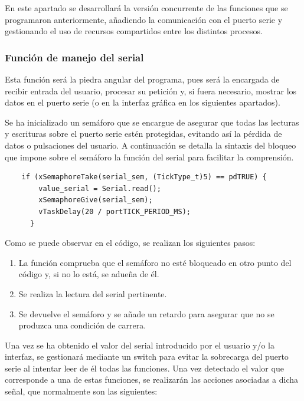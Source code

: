 En este apartado se desarrollará la versión concurrente de las funciones que se programaron anteriormente, añadiendo la comunicación con el puerto serie y gestionando el uso de recursos compartidos entre los distintos procesos. 


\subsubsection{Función de manejo del serial}

Esta función será la piedra angular del programa, pues será la encargada de recibir entrada del usuario, procesar su petición y, si fuera necesario, mostrar los datos en el puerto serie (o en la interfaz gráfica en los siguientes apartados).

Se ha inicializado un semáforo que se encargue de asegurar que todas las lecturas y escrituras sobre el puerto serie estén protegidas, evitando así la pérdida de datos o pulsaciones del usuario. A continuación se detalla la sintaxis del bloqueo que impone sobre el semáforo la función del serial para facilitar la comprensión.

\begin{verbatim}
    if (xSemaphoreTake(serial_sem, (TickType_t)5) == pdTRUE) {
        value_serial = Serial.read();
        xSemaphoreGive(serial_sem);
        vTaskDelay(20 / portTICK_PERIOD_MS);
      }  
\end{verbatim}

Como se puede observar en el código, se realizan los siguientes pasos:

\begin{enumerate}
    \item La función comprueba que el semáforo no esté bloqueado en otro punto del código y, si no lo está, se adueña de él.
    \item Se realiza la lectura del serial pertinente.
    \item Se devuelve el semáforo y se añade un retardo para asegurar que no se produzca una condición de carrera. 
\end{enumerate}

Una vez se ha obtenido el valor del serial introducido por el usuario y/o la interfaz, se gestionará mediante un switch para evitar la sobrecarga del puerto serie al intentar leer de él todas las funciones. Una vez detectado el valor que corresponde a una de estas funciones, se realizarán las acciones asociadas a dicha señal, que normalmente son las siguientes:

